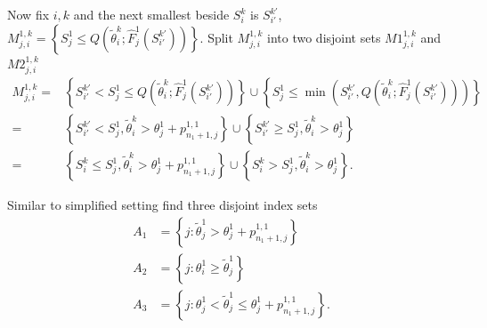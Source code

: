 \documentclass[12pt, a4paper, oneside]{article}
\begin{document}
    Now fix $i,k$ and the next smallest beside $S_{i}^{k}$ is $S_{i'}^{k'}$, $M_{j,i}^{1,k}=\left\{ S_j^1\leq Q(\tilde{\theta}_{i}^{k};\hat{F}_j^1(S_{i'}^{k'})) \right\}$. Split $M_{j,i}^{1,k}$ into two disjoint sets $M1_{j,i}^{1,k}$ and $M2_{j,i}^{1,k}$
    \begin{align*}
        M_{j,i}^{1,k}=&\left\{ S_{i'}^{k'}<S_j^1\leq Q(\tilde{\theta}_{i}^{k};\hat{F}_j^1(S_{i'}^{k'})) \right\}\cup\left\{ S_j^1\leq\min\left( S_{i'}^{k'},Q(\tilde{\theta}_{i}^{k};\hat{F}_j^1(S_{i'}^{k'})) \right) \right\}\\
        =&\left\{ S_{i'}^{k'}<S_j^1,\tilde{\theta}_{i}^{k}>\theta_j^1+p_{n_1+1,j}^{1,1} \right\}\cup\left\{ S_{i'}^{k'}\geq S_j^1,\tilde{\theta}_{i}^{k}>\theta_j^1 \right\}\\
        =&\left\{ S_{i}^{k}\leq S_j^1,\tilde{\theta}_{i}^{k}>\theta_j^1+p_{n_1+1,j}^{1,1} \right\}\cup\left\{ S_{i}^{k}>S_j^1,\tilde{\theta}_{i}^{k}>\theta_j^1 \right\}.
    \end{align*}


    Similar to simplified setting find three disjoint index sets
    \begin{align*}
        A_1&=\left\{ j:\tilde{\theta}_j^1>\theta_j^1+p_{n_1+1,j}^{1,1} \right\}\\
        A_2&=\left\{ j:\theta_i^1\geq\tilde{\theta}_j^1 \right\}\\
        A_3&=\left\{ j:\theta_j^1<\tilde{\theta}_j^1\leq\theta_j^1+p_{n_1+1,j}^{1,1} \right\}.
    \end{align*}
     
\end{document}
